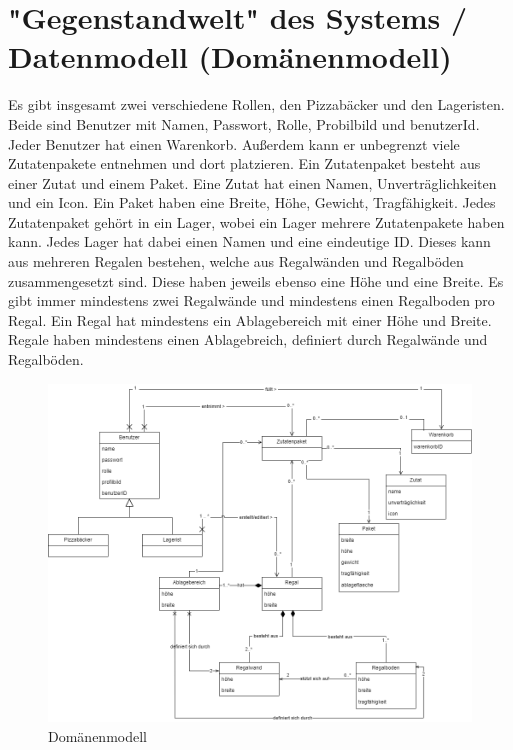 \section{"Gegenstandwelt" des Systems / Datenmodell (Domänenmodell)}
\label{sec:domaenenmodell}
Es gibt insgesamt zwei verschiedene Rollen, den Pizzabäcker und den Lageristen. Beide sind Benutzer mit Namen, Passwort,
Rolle, Probilbild und benutzerId. Jeder Benutzer hat einen Warenkorb. Außerdem kann er unbegrenzt viele Zutatenpakete
entnehmen und dort platzieren. Ein Zutatenpaket besteht aus einer Zutat und einem Paket. Eine Zutat hat einen Namen,
Unverträglichkeiten und ein Icon. Ein Paket haben eine Breite, Höhe, Gewicht, Tragfähigkeit. Jedes Zutatenpaket
gehört in ein Lager, wobei ein Lager mehrere Zutatenpakete haben kann. Jedes Lager hat dabei einen Namen und eine
eindeutige ID. Dieses kann aus mehreren Regalen bestehen, welche aus Regalwänden und Regalböden zusammengesetzt
sind. Diese haben jeweils ebenso eine Höhe und eine Breite. Es gibt immer
mindestens zwei Regalwände und mindestens einen Regalboden pro Regal. Ein Regal hat mindestens ein Ablagebereich mit einer
Höhe und Breite. Regale haben mindestens einen Ablagebreich, definiert durch Regalwände und Regalböden.\\

\begin{figure}[H]
	\centering
	\includegraphics[width=\textwidth]{Bilder/Kapitel/domaenenmodell}
	\caption{Domänenmodell}
	\label{fig:domaenenmodell}
\end{figure}


